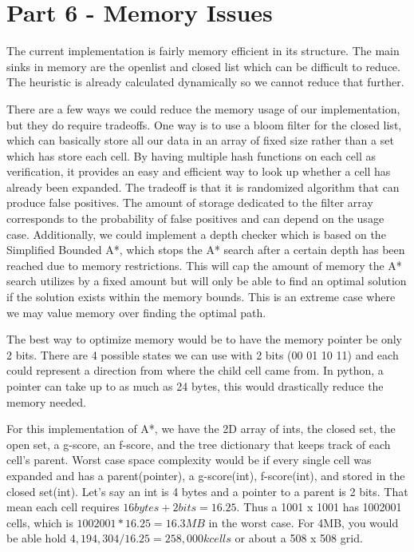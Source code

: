 \documentclass[12pt]{article}
\begin{document}
	\section*{Part 6 - Memory Issues}
	
	The current implementation is fairly memory efficient in its structure. The main sinks in memory are the openlist and closed list which can be difficult to reduce. The heuristic is already calculated dynamically so we cannot reduce that further.
	
	There are a few ways we could reduce the memory usage of our implementation, but they do require tradeoffs. One way is to use a bloom filter for the closed list, which can basically store all our data in an array of fixed size rather than a set which has store each cell.  By having multiple hash functions on each cell as verification, it provides an easy and efficient way to look up whether a cell has already been expanded. The tradeoff is that it is randomized algorithm that can produce false positives. The amount of storage dedicated to the filter array corresponds to the probability of false positives and can depend on the usage case. Additionally, we could implement a depth checker which is based on the Simplified Bounded A*, which stops the A* search after a certain depth has been reached due to memory restrictions. This will cap the amount of memory the A* search utilizes by a fixed amount but will only be able to find an optimal solution if the solution exists within the memory bounds. This is an extreme case where we may value memory over finding the optimal path.
	
	The best way to optimize memory would be to have the memory pointer be only 2 bits. There are 4 possible states we can use with 2 bits (00 01 10 11) and each could represent a direction from where the child cell came from. In python, a pointer can take up to as much as 24 bytes, this would drastically reduce the memory needed.
	
	For this implementation of A*, we have the 2D array of ints, the closed set, the open set, a g-score, an f-score, and the tree dictionary that keeps track of each cell’s parent. Worst case space complexity would be if every single cell was expanded and has a parent(pointer), a g-score(int), f-score(int), and stored in the closed set(int). Let’s say an int is 4 bytes and a pointer to a parent is 2 bits. That mean each cell requires $16 bytes + 2 bits = 16.25$. Thus a 1001 x 1001 has 1002001 cells, which is $1002001 * 16.25 = 16.3MB$ in the worst case. For 4MB, you would be able hold $4,194,304 / 16.25 = 258,000k cells$ or about a 508 x 508 grid. 
	
\end{document}
